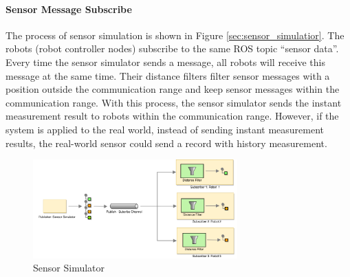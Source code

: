\paragraph{Sensor Message Subscribe}
The process of sensor simulation is shown in Figure \ref{sec:sensor_simulatior}. The robots (robot controller nodes) subscribe to the same ROS topic ``sensor data''. Every time the sensor simulator sends a message, all robots will receive this message at the same time. Their distance filters filter sensor messages with a position outside the communication range and keep sensor messages within the communication range. With this process, the sensor simulator sends the instant measurement result to robots within the communication range. However, if the system is applied to the real world, instead of sending instant measurement results, the real-world sensor could send a record with history measurement.

\begin{figure}
\centering
\includegraphics[width = 0.7\textwidth]{content/images/ch4/sensor_simulator.drawio.png}
\caption{Sensor Simulator}
\label{fig:sensor_simulator}
\end{figure}



